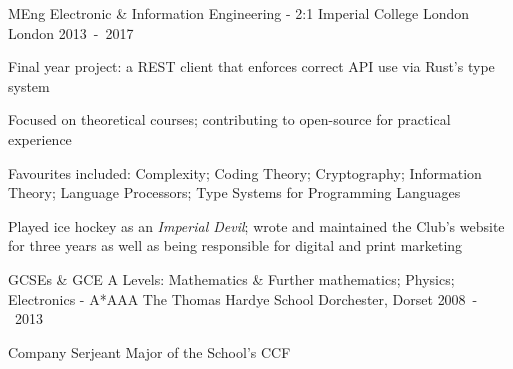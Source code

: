 \begin{cventries}
\nopagebreak

\cventry
  {MEng Electronic \& Information Engineering - 2:1}
  {Imperial College London}
  {London}
  {2013~-~2017}
  {\begin{cvitems}
    \item {Final year project: a REST client that enforces correct API use via Rust's type system}
    \item {Focused on theoretical courses; contributing to open-source for practical experience}
    \item {Favourites included: Complexity; Coding Theory; Cryptography; Information Theory; Language Processors; Type Systems for Programming Languages}
    \item {Played ice hockey as an \emph{Imperial Devil}; wrote and maintained the Club's website for three years as well as being responsible for digital and print marketing}
  \end{cvitems}}

\cventry
  {GCSEs \& GCE A Levels: Mathematics \& Further mathematics; Physics; Electronics - A*AAA}
  {The Thomas Hardye School}
  {Dorchester, Dorset}
  {2008~-~2013}
  {\begin{cvitems}
    \item {Company Serjeant Major of the School's CCF}
  \end{cvitems}}

\end{cventries}
